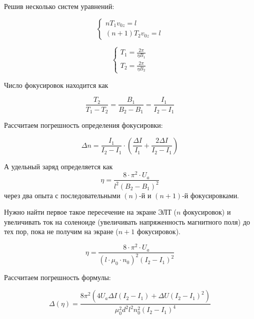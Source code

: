 Решив несколько систем уравнений:

\begin{equation}
	\begin{cases}
		nT_1v_{0z}=l\\
		(n+1)T_2v_{0z}=l
	\end{cases}	
\end{equation}

\begin{equation}
	\begin{cases}
		T_1=\frac{2\pi}{\eta{}B_1}\\
		T_2=\frac{2\pi}{\eta{}B_2}
	\end{cases}	
\end{equation}

Число фокусировок находится как 

\begin{equation}
	\label{eq:n}%
	\frac{T_2}{T_1-T_2}=\frac{B_1}{B_2-B_1}=\frac{I_1}{I_2-I_1}	
\end{equation}

Рассчитаем погрешность определения фокусировки:

\begin{equation}
	\label{eq:delta_n}%
	\Delta{n}=\frac{I_1}{I_2-I_1}\cdot\left(\frac{\Delta{I}}{I_1}+\frac{2\Delta{I}}{I_2-I_1}\right)	
\end{equation}

А удельный заряд определяется как %
%
\begin{equation}
	\eta=\frac{8\cdot\pi^2\cdot{}U_a}{l^2(B_2-B_1)^2}
\end{equation}
%
через два опыта с последовательными $(n)$-й и $(n+1)$-й фокусировками.

Нужно найти первое такое пересечение на экране ЭЛТ ($n$ фокусировок) и увеличивать ток на соленоиде (увеличивать напряженность магнитного поля) до тех пор, пока не получим на экране ($n+1$ фокусировок).

\begin{equation}
	\eta=\frac{8\cdot\pi^2\cdot{}U_a}{(l\cdot\mu_0\cdot{n_0})^2(I_2-I_1)^2}
\end{equation}

Рассчитаем погрешность формулы:

\begin{equation}
	\Delta{(\eta)}=\frac{8 \pi^{2} \left(4 U_{a} \Delta{I} \left(I_{2} - I_{1}\right) + \Delta{U} \left(I_{2} - I_{1}\right)^{2}\right)}{\mu_{0}^{2} d^{2} l^{2} n_{0}^{2} \left(I_{2} - I_{1}\right)^{4}}
\end{equation}

